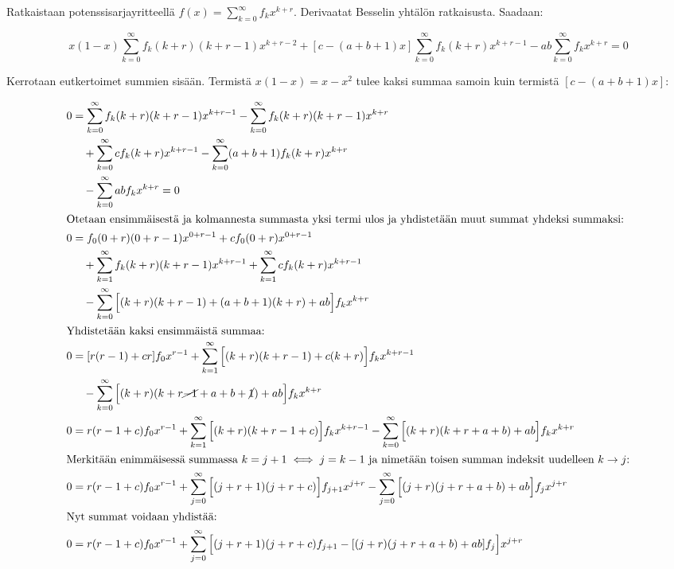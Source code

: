 \documentclass[../johdoksia.tex]{subfiles}
\begin{document}
	Ratkaistaan potenssisarjayritteellä $f(x) = \sum_{k = 0}^{\infty}f_kx^{k + r}$. Derivaatat Besselin yhtälön ratkaisusta. Saadaan:
	
	\begin{equation*}
		x(1 - x)\sum_{k = 0}^{\infty}f_k(k + r)(k + r - 1)x^{k + r - 2} + [c - (a + b + 1)x]\sum_{k = 0}^{\infty}f_k(k + r)x^{k + r - 1} - ab\sum_{k = 0}^{\infty}f_kx^{k + r} = 0
	\end{equation*}

	\noindent Kerrotaan eutkertoimet summien sisään. Termistä $x(1 - x) = x - x^2$ tulee kaksi summaa samoin kuin termistä $[c - (a + b + 1)x]$:
	
	\begin{align*}
		0 &= \sum_{k = 0}^{\infty}f_k(k + r)(k + r - 1)x^{k + r - 1} - \sum_{k = 0}^{\infty}f_k(k + r)(k + r - 1)x^{k + r} \\
		&\quad + \sum_{k = 0}^{\infty}cf_k(k + r)x^{k + r - 1} - \sum_{k = 0}^{\infty}(a + b + 1)f_k(k + r)x^{k + r} \\
		&\quad - \sum_{k = 0}^{\infty}abf_kx^{k + r} = 0 \\
		\intertext{Otetaan ensimmäisestä ja kolmannesta summasta yksi termi ulos ja yhdistetään muut summat yhdeksi summaksi:}
		0 &= f_0(0 + r)(0 + r - 1)x^{0 + r - 1} + cf_0(0 + r)x^{0 + r - 1} \\
		&\quad + \sum_{k = 1}^{\infty}f_k(k + r)(k + r - 1)x^{k + r - 1} + \sum_{k = 1}^{\infty}cf_k(k + r)x^{k + r - 1} \\
		&\quad - \sum_{k = 0}^{\infty}\Big[(k + r)(k + r - 1) + (a + b + 1)(k + r) + ab\Big]f_kx^{k + r} \\
		\intertext{Yhdistetään kaksi ensimmäistä summaa:}
		0 &= [r(r - 1) + cr]f_0x^{r - 1} + \sum_{k = 1}^{\infty}\Big[(k + r)(k + r - 1) + c(k + r)\Big]f_kx^{k + r - 1} \\
		&\quad - \sum_{k = 0}^{\infty}\Big[(k + r)(k + r \cancel{- 1} + a + b + \cancel{1}) + ab\Big]f_kx^{k + r} \\
		0 &= r(r - 1 + c)f_0x^{r - 1} + \sum_{k = 1}^{\infty}\Big[(k + r)(k + r - 1 + c)\Big]f_kx^{k + r - 1} - \sum_{k = 0}^{\infty}\Big[(k + r)(k + r + a + b) + ab\Big]f_kx^{k + r} \\
		\intertext{Merkitään enimmäisessä summassa $k = j + 1 \iff j = k - 1$ ja nimetään toisen summan indeksit uudelleen $k\to j$:}
		0 &= r(r - 1 + c)f_0x^{r - 1} + \sum_{j = 0}^{\infty}\Big[(j + r + 1)(j + r + c)\Big]f_{j + 1}x^{j + r} - \sum_{j = 0}^{\infty}\Big[(j + r)(j + r + a + b) + ab\Big]f_jx^{j + r} \\
		\intertext{Nyt summat voidaan yhdistää:}
		0 &= r(r - 1 + c)f_0x^{r - 1} + \sum_{j = 0}^{\infty}\Big[(j + r + 1)(j + r + c)f_{j + 1} - [(j + r)(j + r + a + b) + ab]f_j\Big]x^{j + r} \\
	\end{align*}
\end{document}

